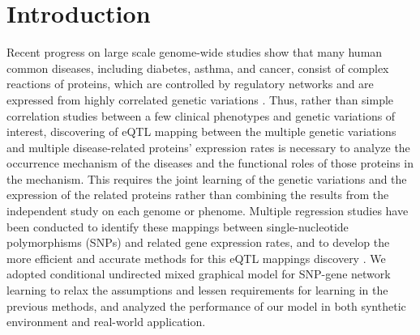 \documentclass{article}
\begin{document}
 


\section{Introduction}
Recent progress on large scale genome-wide studies show that many human common diseases, including diabetes, asthma, and cancer, consist of complex reactions of proteins, which are controlled by regulatory networks and are expressed from highly correlated genetic variations \cite{basso2005reverse, chen2008variations}. Thus, rather than simple correlation studies between a few clinical phenotypes and genetic variations of interest, discovering of eQTL mapping between the multiple genetic variations and multiple disease-related proteins' expression rates is necessary to analyze the occurrence mechanism of the diseases and the functional roles of those proteins in the mechanism. This requires the joint learning of the genetic variations and the expression of the related proteins rather than combining the results from the independent study on each genome or phenome. Multiple regression studies have been conducted to identify these mappings between single-nucleotide polymorphisms (SNPs) and related gene expression rates, and to develop the more efficient and accurate methods for this eQTL mappings discovery \cite{kim2010tree, sohn2012joint}. We adopted conditional undirected mixed graphical model \cite{lee2013structure} for SNP-gene network learning to relax the assumptions and lessen requirements for learning in the previous methods, and analyzed the performance of our model in both synthetic environment and real-world application.
\end{document}
